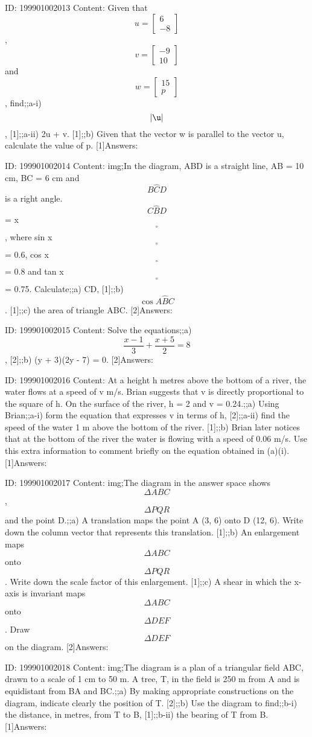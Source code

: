 \documentclass{article}
\begin{document}
ID: 199901002013
Content:
Given that $$u=\begin{bmatrix}6\\-8\end{bmatrix}$$, $$v=\begin{bmatrix}-9\\10\end{bmatrix}$$ and $$w=\begin{bmatrix}15\\p\end{bmatrix}$$, find;;a-i) $$|\u|$$, [1];;a-ii) 2u + v. [1];;b) Given that the vector w is parallel to the vector  u, calculate the value of p. [1]Answers:

ID: 199901002014
Content:
img;In the diagram, ABD is a straight line, AB = 10 cm, BC = 6 cm and $$B \hat CD$$ is a right angle. $$C \hat BD$$ = x$$^{\circ}$$, where sin x$$^{\circ}$$ = 0.6, cos x$$^{\circ}$$ = 0.8 and tan x$$^{\circ}$$ = 0.75. Calculate;;a) CD, [1];;b) $$\cos A \hat BC$$. [1];;c) the area of triangle ABC. [2]Answers:

ID: 199901002015
Content:
Solve the equations;;a) $$\frac{x-1}{3}+\frac{x+5}{2}=8$$, [2];;b) (y + 3)(2y - 7) = 0. [2]Answers:

ID: 199901002016
Content:
At a height h metres above the bottom of a river, the water flows at a speed of v m/s. Brian suggests that v is directly proportional to the square of h. On the surface of the river, h = 2 and v = 0.24.;;a) Using Brian;;a-i) form the equation that expresses v in terms of h, [2];;a-ii) find the speed of the water 1 m above the bottom of the river. [1];;b) Brian later notices that at the bottom of the river the water is flowing with a speed of 0.06 m/s. Use this extra information to comment briefly on the equation obtained in (a)(i). [1]Answers:

ID: 199901002017
Content:
img;The diagram in the answer space shows $$\Delta  ABC$$, $$\Delta  PQR$$ and the point D.;;a) A translation maps the point A (3, 6) onto D (12, 6). Write down the column vector that represents this translation. [1];;b) An enlargement maps $$\Delta  ABC$$ onto $$\Delta  PQR$$. Write down the scale factor of this enlargement. [1];;c) A shear in which the x-axis is invariant maps $$\Delta  ABC$$ onto $$\Delta  DEF$$. Draw $$\Delta  DEF$$ on the diagram. [2]Answers:

ID: 199901002018
Content:
img;The diagram is a plan of a triangular field ABC, drawn to a scale of 1 cm to 50 m. A tree, T, in the field is 250 m from A and is equidistant from BA and BC.;;a) By making appropriate constructions on the diagram, indicate clearly the position of T. [2];;b) Use the diagram to find;;b-i) the distance, in metres, from T to B, [1];;b-ii) the bearing of T from B. [1]Answers:
\end{document}
